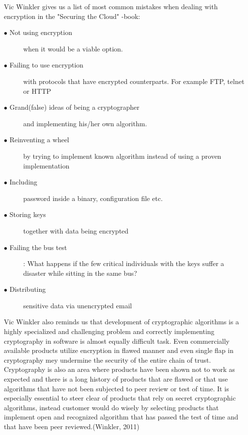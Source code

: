 \documentclass{article}
\begin{document}
\par
Vic Winkler gives us a list of most common mistakes when dealing with encryption in the "Securing the Cloud" -book:
\begin{description}
	\item[$\bullet$ Not using encryption] when it would be a viable option.
	\item[$\bullet$ Failing to use encryption] with protocols that have encrypted counterparts. For example FTP, telnet or HTTP 
	\item[$\bullet$ Grand(false) ideas of being a cryptographer] and implementing his/her own algorithm. 
	\item[$\bullet$ Reinventing a wheel ]by trying to implement known algorithm instead of using a proven implementation
	\item[$\bullet$ Including ]password inside a binary, configuration file etc.
	\item[$\bullet$ Storing keys ]together with data being encrypted
	\item[$\bullet$ Failing the bus test]: What happens if the few critical individuals with the keys suffer a disaster while sitting in the same bus? 
	\item[$\bullet$ Distributing] sensitive data via unencrypted email
\end{description} 
Vic Winkler also reminds us that development of cryptographic algorithms is a highly specialized and challenging problem and correctly implementing cryptography in software is almost equally difficult task. Even commercially available products utilize encryption in flawed manner and even single flap in cryptography mey undermine the security of the entire chain of trust. Cryptography is also an area where products have been shown not to work as expected and there is a long history of products that are flawed or that use algorithms that have not been subjected to peer review or test of time. It is especially essential to steer clear of products that rely on secret cryptographic algorithms, instead customer would do wisely by selecting products that implement open and recognized algorithm that has passed the test of time and that have been peer reviewed.(Winkler, 2011)
\end{document}
